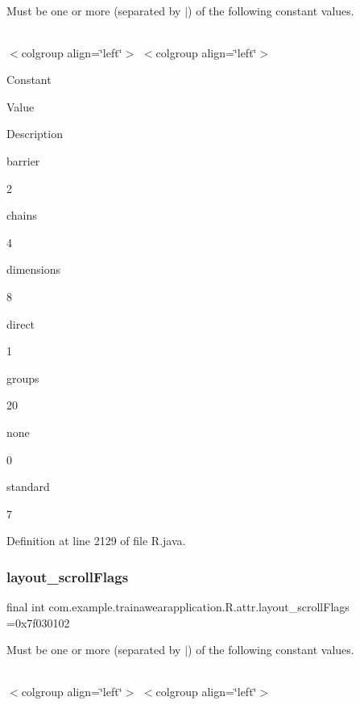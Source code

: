 Must be one or more (separated by \textquotesingle{}$\vert$\textquotesingle{}) of the following constant values.

\tabulinesep=1mm
\begin{longtabu}spread 0pt [c]{*{0}{|X[-1]}|}
\hline
\end{longtabu}
$<$colgroup align=\char`\"{}left\char`\"{}$>$ $<$colgroup align=\char`\"{}left\char`\"{}$>$ 

Constant

Value

Description 

barrier

2

chains

4

dimensions

8

direct

1

groups

20

none

0

standard

7

Definition at line 2129 of file R.\+java.

\mbox{\label{classcom_1_1example_1_1trainawearapplication_1_1_r_1_1attr_a96e28cca2c84297df64b0b8dcef09002}} 
\subsubsection{\texorpdfstring{layout\_scrollFlags}{layout\_scrollFlags}}
{\footnotesize\ttfamily final int com.\+example.\+trainawearapplication.\+R.\+attr.\+layout\+\_\+scroll\+Flags =0x7f030102\hspace{0.3cm}{\ttfamily [static]}}

Must be one or more (separated by \textquotesingle{}$\vert$\textquotesingle{}) of the following constant values.

\tabulinesep=1mm
\begin{longtabu}spread 0pt [c]{*{0}{|X[-1]}|}
\hline
\end{longtabu}
$<$colgroup align=\char`\"{}left\char`\"{}$>$ $<$colgroup align=\char`\"{}left\char`\"{}$>$ 

